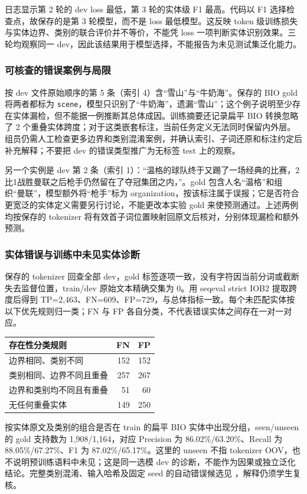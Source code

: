 \documentclass[UTF8,a4paper,12pt,fontset=none]{ctexart}
\begin{document}
日志显示第 2 轮的 dev loss 最低，第 3 轮的实体级 F1 最高。代码以 F1 选择检查点，故保存的是第 3 轮模型，而不是 loss 最低模型。这反映 token 级训练损失与实体边界、类别的联合评价并不等价，不能凭 loss 一项判断实体识别效果。三轮均观察同一 dev，因此该结果用于模型选择，不能报告为未见测试集泛化能力。

\subsubsection{可核查的错误案例与局限}
按 dev 文件原始顺序的第 5 条（索引 4）含“雪山”与“牛奶海”。保存的 BIO gold 将两者都标为 \texttt{scene}，模型只识别了“牛奶海”，遗漏“雪山”；这个例子说明至少存在实体漏检，但不能据一例推断其总体成因。训练摘要还记录扁平 BIO 转换忽略了 2 个重叠实体跨度；对于这类嵌套标注，当前任务定义无法同时保留内外层。组员仍需人工检查更多边界和类别混淆案例，并确认索引、子词还原和标注约定后补充解释；不要把 dev 的错误类型推广为无标签 test 上的观察。

另一个实例是 dev 第 2 条（索引 1）：“温格的球队终于又踢了一场经典的比赛，2比1战胜曼联之后枪手仍然留在了夺冠集团之内，”。gold 包含人名“温格”和组织“曼联”，模型额外将“枪手”标为 organization，按该标注属于误报；它是否符合更宽泛的实体定义需要另行讨论，不能更改本实验 gold 来使预测通过。上述两例均按保存的 tokenizer 将有效首子词位置映射回原文后核对，分别体现漏检和额外预测。

\subsubsection{实体错误与训练中未见实体诊断}
保存的 tokenizer 回查全部 dev，gold 标签逐项一致，没有字符因当前分词或截断失去监督位置，train/dev 原始文本精确交集为 0。用 seqeval strict IOB2 提取跨度后得到 TP=2,463、FN=609、FP=729，与总体指标一致。每个未匹配实体按以下优先规则归一类；FN 与 FP 各自分类，不代表错误实体之间存在一对一对应。

\noindent\begin{tabularx}{\textwidth}{Yrr}
\toprule
存在性分类规则 & FN & FP \\
\midrule
边界相同、类别不同 & 152 & 152 \\
类别相同、边界不同且重叠 & 257 & 267 \\
边界和类别均不同且有重叠 & 51 & 60 \\
无任何重叠实体 & 149 & 250 \\
\bottomrule
\end{tabularx}

按实体原文及类别的组合是否在 train 的扁平 BIO 实体中出现分组，seen/unseen 的 gold 支持数为 1,908/1,164，对应 Precision 为 86.02\%/63.20\%、Recall 为 88.05\%/67.27\%、F1 为 87.02\%/65.17\%。这里的 unseen 不指 tokenizer OOV，也不说明预训练语料中未见；这是同一选模 dev 的诊断，不能作为因果或独立泛化结论。完整类别混淆、输入哈希及固定 seed 的自动错误候选见 ，解释仍须学生复核。
\end{document}
